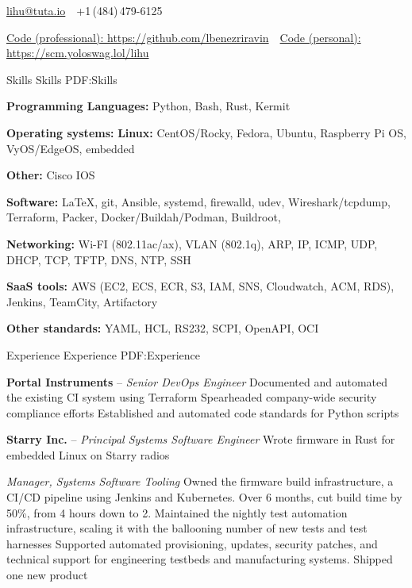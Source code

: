 \documentclass[letterpaper,MMMyyyy,nonstopmode]{simpleresumecv}
\newcommand{\CVAuthor}{Lihu Ben-Ezri-Ravin}
\begin{document}
\Title{\CVAuthor}

\begin{SubTitle}
\href{mailto:lihu@tuta.io}
{lihu@tuta.io}
\,\SubBulletSymbol\,
+1\,(484)\,479-6125
\par
\href{https://github.com/lbenezriravin}
{Code (professional): \url{https://github.com/lbenezriravin}}
\,\SubBulletSymbol\,
\href{https://scm.yoloswag.lol/lihu}
{Code (personal): \url{https://scm.yoloswag.lol/lihu}}
\end{SubTitle}

\begin{Body}

\Section
{Skills}
{Skills}
{PDF:Skills}
{\raggedright

\Entry
\textbf{Programming Languages: }
Python,
Bash,
Rust,
Kermit

\Entry
\textbf{Operating systems:}
\Gap
\BulletItem
\textbf{Linux: }
CentOS/Rocky,
Fedora,
Ubuntu,
Raspberry Pi OS,
VyOS/EdgeOS,
embedded

\Gap
\BulletItem
\textbf{Other: }
Cisco IOS

\Entry
\textbf{Software: }
{\LaTeX},
git,
Ansible,
systemd,
firewalld,
udev,
Wireshark/tcpdump,
Terraform,
Packer,
Docker/Buildah/Podman,
Buildroot,

\Entry
\textbf{Networking: }
Wi-FI (802.11ac/ax),
VLAN (802.1q),
ARP,
IP,
ICMP,
UDP,
DHCP,
TCP,
TFTP,
DNS,
NTP,
SSH

\Entry
\textbf{SaaS tools: }
AWS (EC2, ECS, ECR, S3, IAM, SNS, Cloudwatch, ACM, RDS),
Jenkins,
TeamCity,
Artifactory

\Entry
\textbf{Other standards: }
YAML,
HCL,
RS232,
SCPI,
OpenAPI,
OCI

}

\Section
{Experience}
{Experience}
{PDF:Experience}

\Entry
\textbf{Portal Instruments}
\hfill
{} --
\Gap
\textit{Senior DevOps Engineer}
\Gap
\BulletItem
Documented and automated the existing CI system using Terraform
\BulletItem
Spearheaded company-wide security compliance efforts
\BulletItem
Established and automated code standards for Python scripts

\BigGap

\Entry
\textbf{Starry Inc.}
\hfill
{} --
\Gap
\textit{Principal Systems Software Engineer}
\Gap
\BulletItem
Wrote firmware in Rust for embedded Linux on Starry radios

\BigGap
\textit{Manager, Systems Software Tooling}
\Gap
\BulletItem
Owned the firmware build infrastructure, a CI/CD pipeline using Jenkins and
Kubernetes. Over 6 months, cut build time by 50\%, from 4 hours down to 2.
\BulletItem
Maintained the nightly test automation infrastructure, scaling it with
the ballooning number of new tests and test harnesses
\BulletItem
Supported automated provisioning, updates, security patches, and
technical support for engineering testbeds and manufacturing systems.
\BulletItem
Shipped one new product


\end{Body}
\end{document}
